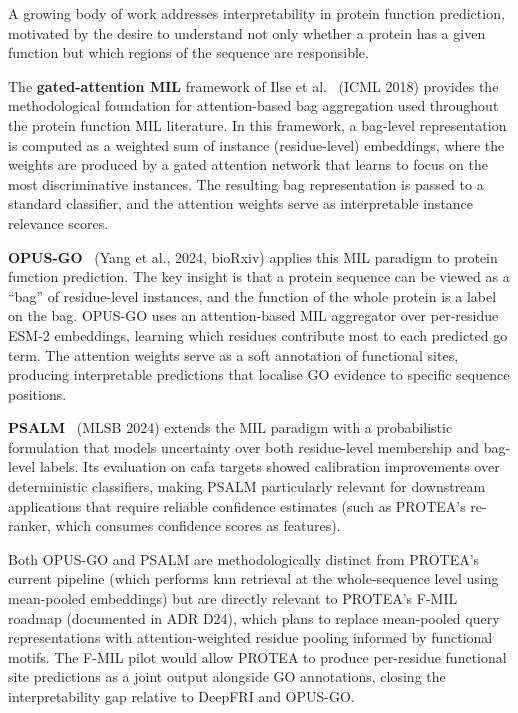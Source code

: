 A growing body of work addresses interpretability in protein function prediction,
motivated by the desire to understand not only whether a protein has a given
function but which regions of the sequence are responsible.

The \textbf{gated-attention MIL} framework of Ilse et al.~\cite{ilse2018attention}
(ICML 2018) provides the methodological foundation for attention-based bag
aggregation used throughout the protein function MIL literature. In this
framework, a bag-level representation is computed as a weighted sum of instance
(residue-level) embeddings, where the weights are produced by a gated attention
network that learns to focus on the most discriminative instances. The resulting
bag representation is passed to a standard classifier, and the attention weights
serve as interpretable instance relevance scores.

\textbf{OPUS-GO}~\cite{opusgo2024} (Yang et al., 2024, bioRxiv) applies
this MIL paradigm to protein function prediction. The key insight
is that a protein sequence can be viewed as a ``bag'' of residue-level instances,
and the function of the whole protein is a label on the bag. OPUS-GO uses an
attention-based MIL aggregator over per-residue ESM-2 embeddings, learning which
residues contribute most to each predicted \gls{go} term. The attention weights
serve as a soft annotation of functional sites, producing interpretable
predictions that localise GO evidence to specific sequence positions.

\textbf{PSALM}~\cite{psalm2024} (MLSB 2024) extends the MIL paradigm with a
probabilistic formulation that models uncertainty over both residue-level
membership and bag-level labels. Its evaluation on \gls{cafa} targets showed
calibration improvements over deterministic classifiers, making PSALM
particularly relevant for downstream applications that require reliable
confidence estimates (such as PROTEA's re-ranker, which consumes confidence
scores as features).

Both OPUS-GO and PSALM are methodologically distinct from PROTEA's current
pipeline (which performs \gls{knn} retrieval at the whole-sequence level using
mean-pooled embeddings) but are directly relevant to PROTEA's F-MIL roadmap
(documented in ADR D24), which plans to replace mean-pooled query representations
with attention-weighted residue pooling informed by functional motifs. The
F-MIL pilot would allow PROTEA to produce per-residue functional site predictions
as a joint output alongside GO annotations, closing the interpretability gap
relative to DeepFRI and OPUS-GO.

